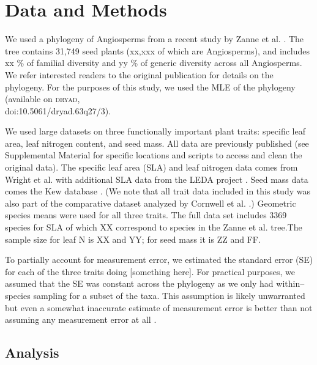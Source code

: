 \documentclass[a4paper,12pt]{article}
\begin{document}
\section{Data and Methods}

We used a phylogeny of Angiosperms from a recent study by Zanne et al. \citep{Zanne2013}. The tree contains 31,749 seed plants (xx,xxx of which are Angiosperms), and includes xx \% of familial diversity and yy \% of generic diversity across all Angiosperms. We refer interested readers to the original publication \citep{Zanne2013} for details on the phylogeny. For the purposes of this study, we used the MLE of the phylogeny (available on \textsc{dryad},\\ doi:10.5061/dryad.63q27/3).

We used large datasets on three functionally important plant traits: specific leaf area, leaf nitrogen content, and seed mass. All data are previously published (see Supplemental Material for specific locations and scripts to access and clean the original data). The specific leaf area (SLA) and leaf nitrogen data comes from Wright et al. \citep{Wright2004} with additional SLA data from the LEDA project \citep{Kleyer2008}. Seed mass data comes the Kew database \citep{Kew2008}. (We note that all trait data included in this study was also part of the comparative dataset analyzed by Cornwell et al. \citep{ksi}.) Geometric species means were used for all three traits.  The full data set includes 3369 species for SLA of which XX correspond to species in the Zanne et al. \citep{Zanne2013} tree.The sample size for leaf N is XX and YY; for seed mass it is ZZ and FF.  

To partially account for measurement error, we estimated the standard error (SE) for each of the three traits doing [something here]. For practical purposes, we assumed that the SE was constant across the phylogeny as we only had within--species sampling for a subset of the taxa. This assumption is likely unwarranted but even a somewhat inaccurate estimate of measurement error is better than not assuming any measurement error at all \citep{Hansen2012}.

\subsection{Analysis}
\end{document}
